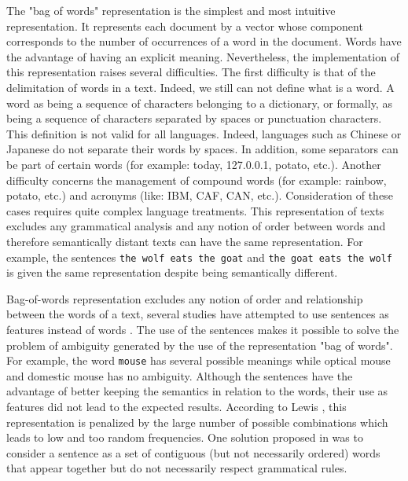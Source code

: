 The "bag of words" representation is the simplest and most intuitive
representation. It represents each document by a vector
whose component corresponds to the number of occurrences of a word in
the document.  Words have the advantage of having an
explicit meaning. Nevertheless, the implementation of this
representation raises several difficulties. The first difficulty is that
of the delimitation of words in a text. Indeed, we still can not define
what is a word. A word as being a sequence of
characters belonging to a dictionary, or formally, as being a sequence
of characters separated by spaces or punctuation characters. This
definition is not valid for all languages. Indeed, languages such as
Chinese or Japanese do not separate their words by spaces. In addition, some separators can be part of certain words (for example: today,
127.0.0.1, potato, etc.). Another difficulty concerns the management of
compound words (for example: rainbow, potato, etc.) and acronyms (like:
IBM, CAF, CAN, etc.). Consideration of these cases requires quite
complex language treatments. This representation of texts excludes any
grammatical analysis and any notion of order between words and therefore
semantically distant texts can have the same representation. For
example, the sentences \texttt{the\ wolf\ eats\ the\ goat} and
\texttt{the\ goat\ eats\ the\ wolf} is given the same representation
despite being semantically different.


Bag-of-words representation excludes any notion of order and
relationship between the words of a text, several studies have
attempted to use sentences as features instead of words \citep{fuhr1991probabilistic} \citep{tzeras1993automatic}.
The use of the sentences makes it possible to solve the problem of
ambiguity generated by the use of the representation "bag of words". For
example, the word \texttt{mouse} has several possible meanings while
optical mouse and domestic mouse has no ambiguity. Although the
sentences have the advantage of better keeping the semantics in relation
to the words, their use as features did not lead to the expected
results. According to Lewis \citep{lewis1992representation}, this representation is penalized
by the large number of possible combinations which leads to low and too
random frequencies. One solution proposed in \citep{caropreso2001learner} was to consider a
sentence as a set of contiguous (but not necessarily ordered) words that
appear together but do not necessarily respect grammatical rules.

